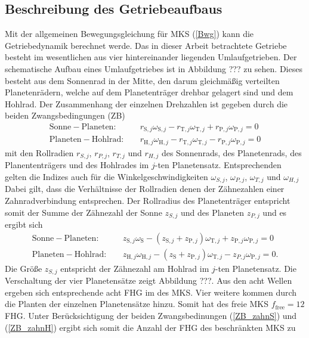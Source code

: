 \subsection{Beschreibung des Getriebeaufbaus}
Mit der allgemeinen Bewegungsgleichung für MKS (\ref{Bwg}) kann die Getriebedynamik berechnet werde. Das in dieser Arbeit betrachtete Getriebe besteht im wesentlichen aus vier hintereinander liegenden Umlaufgetrieben. Der schematische Aufbau eines Umlaufgetriebes ist in Abbildung ??? zu sehen. Dieses besteht aus dem Sonnenrad in der Mitte, den darum gleichmäßig verteilten Planetenrädern, welche auf dem Planetenträger drehbar gelagert sind und dem Hohlrad. Der Zusammenhang der einzelnen Drehzahlen ist gegeben durch die beiden Zwangsbedingungen (ZB)
\begin{align}
\mathrm{Sonne - Planeten}:\quad &r_{\mathrm{S},j}\omega_{\mathrm{S},j} - r_{\mathrm{T},j}\omega_{\mathrm{T},j}+ r_{\mathrm{P},j}\omega_{\mathrm{P},j}=0 \\
\mathrm{Planeten - Hohlrad}:\quad &r_{\mathrm{H},j}\omega_{\mathrm{H},j} - r_{\mathrm{T},j}\omega_{\mathrm{T},j}- r_{\mathrm{P},j}\omega_{\mathrm{P},j}=0
\end{align}
mit den Rollradien $r_{S,j}$, $r_{P,j}$, $r_{T,j}$ und $r_{H,j}$ des Sonnenrads, des Planetenrads, des Planententrägers und des Hohlrades im $j$-ten Planetensatz. Entsprechenden gelten die Indizes auch für die Winkelgeschwindigkeiten $\omega_{S,j}$, $\omega_{P,j}$, $\omega_{T,j}$ und $\omega_{H,j}$
Dabei gilt, dass die Verhältnisse der Rollradien denen der Zähnezahlen einer Zahnradverbindung entsprechen. Der Rollradius des Planetenträger entspricht somit der Summe der Zähnezahl der Sonne $z_{S,j}$ und des Planeten $z_{P,j}$ und es ergibt sich
\begin{align}\label{ZB_zahnS}
\mathrm{Sonne - Planeten}:\quad &z_{\mathrm{S},j}\omega_\mathrm{S} - (z_{\mathrm{S},j} + z_{\mathrm{P},j})\omega_{\mathrm{T},j}+ z_{\mathrm{P},j}\omega_{\mathrm{P},j}=0 \\ \label{ZB_zahnH}
\mathrm{Planeten - Hohlrad}:\quad &z_{\mathrm{H},j}\omega_{\mathrm{H},j} - (z_\mathrm{S} + z_{\mathrm{P},j})\omega_{\mathrm{T},j}- z_{P,j}\omega_{\mathrm{P},j}=0.
\end{align}
Die Größe  $z_{S,j}$ entspricht der Zähnezahl am Hohlrad im $j$-ten Planetensatz. Die Verschaltung der vier Planetensätze zeigt Abbildung ???. Aus den acht Wellen ergeben sich entsprechende acht FHG im des MKS. Vier weitere kommen durch die Planten der einzelnen Planetensätze hinzu. Somit hat des freie MKS $f_{\textrm{free}}=12$ FHG. Unter Berücksichtigung der beiden Zwangsbedinungen (\ref{ZB_zahnS}) und (\ref{ZB_zahnH}) ergibt sich somit die Anzahl der FHG des beschränkten MKS zu
